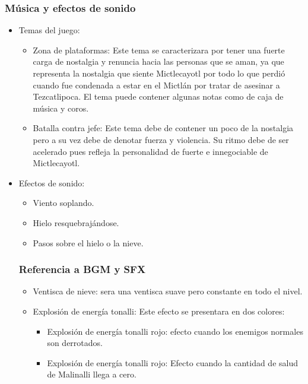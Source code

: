 \documentclass[11pt,letterpaper]{article}
\begin{document}
        \subsubsection{Música y efectos de sonido}
\begin{itemize} 
        \item Temas del juego:
\begin{itemize} 
        \item Zona de plataformas: Este tema se caracterizara por tener una fuerte carga de nostalgia y renuncia hacia las personas que se aman, ya que representa la nostalgia que siente Mictlecayotl por todo lo que perdió cuando fue condenada a estar en el Mictlán por tratar de asesinar a Tezcatlipoca. El tema puede contener algunas notas como de caja de música y coros.
        \item Batalla contra jefe: Este tema debe de contener un poco de la nostalgia pero a su vez debe de denotar fuerza y violencia. Su ritmo debe de ser acelerado pues refleja la personalidad de fuerte e innegociable de Mictlecayotl.
\end{itemize}
        \item Efectos de sonido:
\begin{itemize} 
        \item Viento soplando.
        \item Hielo resquebrajándose.
        \item Pasos sobre el hielo o la nieve.	
\end{itemize}

        \subsubsection{Referencia a BGM y SFX}
\begin{itemize} 
        \item Ventisca de nieve: sera una ventisca suave pero constante en todo el nivel.
\item Explosión de energía tonalli: Este efecto se presentara en dos colores:
        \begin{itemize}
                \item Explosión de energía tonalli rojo: efecto cuando los enemigos normales son derrotados.
                \item Explosión de energía tonalli rojo: Efecto cuando la cantidad de salud de Malinalli llega a cero.
        \end{itemize}
\end{itemize} 
\end{itemize} 
\end{document}
